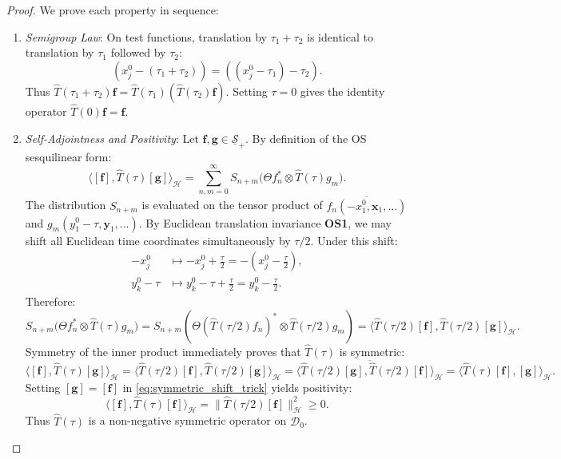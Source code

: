 \begin{proof}
We prove each property in sequence:
\begin{enumerate}
    \item \emph{Semigroup Law}: On test functions, translation by $\tau_1 + \tau_2$ is identical to translation by $\tau_1$ followed by $\tau_2$:
    \begin{equation}
    (x_j^0 - (\tau_1 + \tau_2)) = ((x_j^0 - \tau_1) - \tau_2).
    \end{equation}
    Thus $\hat{T}(\tau_1 + \tau_2) \mathbf{f} = \hat{T}(\tau_1) (\hat{T}(\tau_2) \mathbf{f})$. Setting $\tau = 0$ gives the identity operator $\hat{T}(0) \mathbf{f} = \mathbf{f}$.

    \item \emph{Self-Adjointness and Positivity}: Let $\mathbf{f}, \mathbf{g} \in \underline{\mathcal{S}}_+$. By definition of the OS sesquilinear form:
    \begin{equation}
    \langle [\mathbf{f}], \hat{T}(\tau) [\mathbf{g}] \rangle_{\mathcal{H}} = \sum_{n, m=0}^\infty S_{n+m}\bigl( \Theta f_n^* \otimes \hat{T}(\tau) g_m \bigr).
    \end{equation}
    The distribution $S_{n+m}$ is evaluated on the tensor product of $\overline{f_n(-x_1^0, \mathbf{x}_1, \dots)}$ and $g_m(y_1^0 - \tau, \mathbf{y}_1, \dots)$. By Euclidean translation invariance \textbf{OS1}, we may shift all Euclidean time coordinates simultaneously by $\tau/2$. Under this shift:
    \begin{align}
    -x_j^0 &\mapsto -x_j^0 + \frac{\tau}{2} = -\left( x_j^0 - \frac{\tau}{2} \right), \\
    y_k^0 - \tau &\mapsto y_k^0 - \tau + \frac{\tau}{2} = y_k^0 - \frac{\tau}{2}.
    \end{align}
    Therefore:
    \begin{equation}
    \label{eq:symmetric_shift_trick}
    S_{n+m}\bigl( \Theta f_n^* \otimes \hat{T}(\tau) g_m \bigr) = S_{n+m}\left( \Theta \left(\hat{T}(\tau/2) f_n\right)^* \otimes \hat{T}(\tau/2) g_m \right) = \langle \hat{T}(\tau/2) [\mathbf{f}], \hat{T}(\tau/2) [\mathbf{g}] \rangle_{\mathcal{H}}.
    \end{equation}
    Symmetry of the inner product immediately proves that $\hat{T}(\tau)$ is symmetric:
    \begin{equation}
    \langle [\mathbf{f}], \hat{T}(\tau) [\mathbf{g}] \rangle_{\mathcal{H}} = \langle \hat{T}(\tau/2) [\mathbf{f}], \hat{T}(\tau/2) [\mathbf{g}] \rangle_{\mathcal{H}} = \overline{\langle \hat{T}(\tau/2) [\mathbf{g}], \hat{T}(\tau/2) [\mathbf{f}] \rangle_{\mathcal{H}}} = \langle \hat{T}(\tau) [\mathbf{f}], [\mathbf{g}] \rangle_{\mathcal{H}}.
    \end{equation}
    Setting $[\mathbf{g}] = [\mathbf{f}]$ in \eqref{eq:symmetric_shift_trick} yields positivity:
    \begin{equation}
    \langle [\mathbf{f}], \hat{T}(\tau) [\mathbf{f}] \rangle_{\mathcal{H}} = \|\hat{T}(\tau/2) [\mathbf{f}]\|_{\mathcal{H}}^2 \ge 0.
    \end{equation}
    Thus $\hat{T}(\tau)$ is a non-negative symmetric operator on $\mathcal{D}_0$.


\end{enumerate}
\end{proof}
